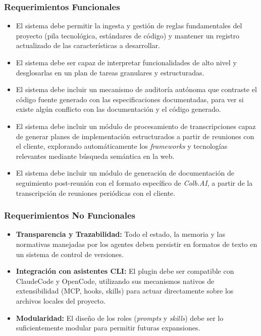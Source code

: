 \documentclass[11pt, letterpaper]{article}
\begin{document}
\subsubsection{Requerimientos Funcionales}
\label{sec:req_funcionales}
\begin{itemize}
    \item El sistema debe permitir la ingesta y gestión de reglas fundamentales del proyecto (pila tecnológica, estándares de código) y mantener un registro actualizado de las características a desarrollar.
    \item El sistema debe ser capaz de interpretar funcionalidades de alto nivel y desglosarlas en un plan de tareas granulares y estructuradas.
    \item El sistema debe incluir un mecanismo de auditoría autónoma que contraste el código fuente generado con las especificaciones documentadas, para ver si existe algún conflicto con las documentación y el código generado.
    \item El sistema debe incluir un módulo de procesamiento de transcripciones capaz de generar planes de implementación estructurados a partir de reuniones con el cliente, explorando automáticamente los \textit{frameworks} y tecnologías relevantes mediante búsqueda semántica en la web.
    \item El sistema debe incluir un módulo de generación de documentación de seguimiento post-reunión con el formato específico de \textit{Colb.AI}, a partir de la transcripción de reuniones periódicas con el cliente.
\end{itemize}

\subsubsection{Requerimientos No Funcionales}
\label{sec:req_no_funcionales}
\begin{itemize}
    \item \textbf{Transparencia y Trazabilidad:} Todo el estado, la memoria y las normativas manejadas por los agentes deben persistir en formatos de texto en un sistema de control de versiones.
    \item \textbf{Integración con asistentes CLI:} El plugin debe ser compatible con ClaudeCode y OpenCode, utilizando sus mecanismos nativos de extensibilidad (MCP, hooks, skills) para actuar directamente sobre los archivos locales del proyecto.
    \item \textbf{Modularidad:} El diseño de los roles (\textit{prompts} y \textit{skills}) debe ser lo suficientemente modular para permitir futuras expansiones.
\end{itemize}
\end{document}
